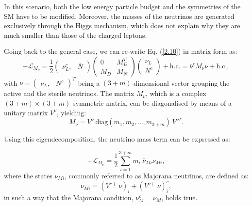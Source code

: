 In this scenario, both the low energy particle budget and the symmetries of the SM have to be modified. Moreover, the masses of the neutrinos are generated exclusively through the Higgs mechanism, which does not explain why they are much smaller than those of the charged leptons.

Going back to the general case, we can re-write Eq. (\ref{2.10}) in matrix form as:
\begin{equation}
	-\mathcal{L}_{M_{\nu}} = \frac{1}{2} \begin{pmatrix}\bar{\nu}^{c}_{L},&\bar{N}\end{pmatrix} \begin{pmatrix}0 & M_{D}^{T}\\M_{D} & M_{N}\end{pmatrix}\begin{pmatrix}\nu_{L}\\N^{c}\end{pmatrix} + \mathrm{h.c.} = \bar{\nu}^{c} M_{\nu} \nu + \mathrm{h.c.},
\end{equation}
with $\nu=\begin{pmatrix}\nu_{L}, & N^{c}\end{pmatrix}^{T}$ being a $(3+m)$-dimensional vector grouping the active and the sterile neutrinos. The matrix $M_{\nu}$, which is a complex $(3+m)\times(3+m)$ symmetric matrix, can be diagonalised by means of a unitary matrix $V^{\nu}$, yielding:
\begin{equation}
	M_{\nu} = V^{\nu}~\mathrm{diag}(m_{1}, m_{2}, \dots, m_{3+m})~V^{\nu T}.
\end{equation}

Using this eigendecomposition, the neutrino mass term can be expressed as:

\begin{equation}
	-\mathcal{L}_{M_{\nu}} = \frac{1}{2} \sum_{i=1}^{3+m} m_{i}~\bar{\nu}_{M i} \nu_{M i},
\end{equation}
where the states $\nu_{M i}$, commonly referred to as Majorana neutrinos, are defined as:
\begin{equation}
	\nu_{M i} = \left(V^{\nu\dagger}~\nu\right)_{i} + \left(V^{\nu\dagger}~\nu\right)^{c}_{i},
\end{equation}
in such a way that the Majorana condition, $\nu^{c}_{M} = \nu_{M}$, holds true.

